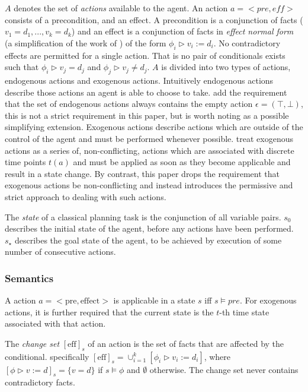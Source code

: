 \documentclass{article}
\theoremstyle{plain}
\theoremstyle{definition}
\begin{document}
$A$ denotes the set of \textit{actions} available to the agent. An action $a=<pre,eff>$ consists of a precondition, and an effect. A precondition is a conjunction of facts ($v_1=d_1,...,v_k=d_k$) and an effect is a conjunction of facts in \textit{effect normal form} (a simplification of the work of \citet{rintanen2003expressive}) of the form $\phi_i \triangleright v_i:=d_i$. No contradictory effects are permitted for a single action. That is no pair of conditionals exists such that $\phi_i \triangleright v_j=d_j$ and $\phi_j \triangleright v_j \neq d_j$. $A$ is divided into two types of actions, endogenous actions and exogenous actions. Intuitively endogenous actions describe those actions an agent is able to choose to take. \citet{lind2019ethical} add the requirement that the set of endogenous actions always contains the empty action $\epsilon=(\top,\bot)$, this is not a strict requirement in this paper, but is worth noting as a possible simplifying extension. Exogenous actions describe actions which are outside of the control of the agent and must be performed whenever possible. \citet{lind2019ethical} treat exogenous actions as a series of, non-conflicting, actions which are associated with discrete time points $t(a)$ and must be applied as soon as they become applicable and result in a state change. By contrast, this paper drops the requirement that exogenous actions be non-conflicting and instead introduces the permissive and strict approach to dealing with such actions.

The \textit{state} of a classical planning task is the conjunction of all variable pairs. $s_0$ describes the initial state of the agent, before any actions have been performed. $s_\star$ describes the goal state of the agent, to be achieved by execution of some number of consecutive actions.

\subsubsection*{Semantics}
A action $a=<\textrm{pre}, \textrm{effect}>$ is applicable in a state $s$ iff $s\models pre$. For exogenous actions, it is further required that the current state is the $t$-th time state associated with that action. 

The \textit{change set} $[\textrm{eff}]_s$ of an action is the set of facts that are affected by the conditional. specifically $[\textrm{eff}]_s=\cup^k_{i=1}[\phi_i \triangleright v_i:=d_i]$, where $[\phi \triangleright v:=d]_s=\{v=d\}$ if $s \models \phi$ and $\emptyset$ otherwise. The change set never contains contradictory facts.
\end{document}
